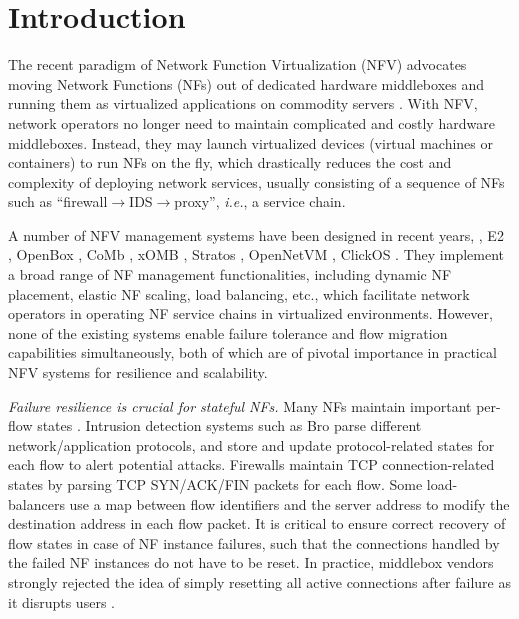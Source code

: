 \section{Introduction}


The recent paradigm of Network Function Virtualization (NFV) advocates moving
Network Functions (NFs) out of dedicated hardware middleboxes and running them as
virtualized applications on commodity servers \cite{nfv-white-paper}. With NFV, network
operators no longer need to maintain complicated and costly hardware middleboxes. Instead,
they may launch virtualized devices (virtual machines or containers) to run NFs on the fly, which
drastically reduces the cost and complexity of deploying network services, usually consisting of a sequence of NFs such as ``firewall$\rightarrow$IDS$\rightarrow$proxy'', {\em i.e.}, a service chain.

A number of NFV management systems have been designed in recent years, \eg, E2 \cite{palkar2015e2}, OpenBox \cite{OpenBox}, CoMb
\cite{sekar2012design}, xOMB \cite{anderson2012xomb}, Stratos
\cite{gember2012stratos}, OpenNetVM \cite{hwang2015netvm, zhang2016opennetvm}, ClickOS \cite{martins2014clickos}. They implement a
broad range of NF management functionalities, including %
 dynamic NF placement, elastic NF scaling,
load balancing, etc., which facilitate network operators in operating NF service chains in virtualized environments. However, none of the existing systems enable failure
tolerance \cite{rajagopalan2013pico, sherry2015rollback} and flow migration \cite{gember2015opennf, rajagopalan2013split, khalid2016paving} capabilities simultaneously, both of which are of pivotal importance in practical NFV systems for resilience and scalability.

{\em Failure resilience is crucial for stateful NFs.}  Many NFs maintain important per-flow states \cite{EnablingNF}. Intrusion
detection systems such as Bro \cite{bro} parse different network/application
protocols, and store and update protocol-related
states for each flow to alert potential attacks. Firewalls \cite{firewall}
maintain TCP connection-related states by parsing TCP SYN/ACK/FIN packets for
each flow. Some load-balancers \cite{lvs} use a map between flow identifiers and
the server address to modify the destination address in each flow packet.
It is critical to ensure correct recovery of flow states in case of NF instance failures, such that the connections handled by the failed NF instances do not have to be reset. In practice, middlebox vendors
strongly rejected the idea of simply resetting all active connections after failure as it
disrupts users \cite{sherry2015rollback}.

